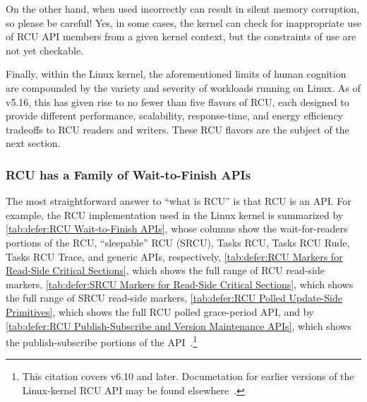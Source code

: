 On the other hand, when used incorrectly  can
result in silent memory corruption, so please be careful!
Yes, in some cases, the kernel can check for inappropriate use of
RCU API members from a given kernel context, but the constraints of
 use are not yet checkable.

Finally, within the Linux kernel, the aforementioned limits of human
cognition are compounded by the variety and severity of workloads running
on Linux.
As of v5.16, this has given rise to no fewer than five flavors of
RCU, each designed to provide different performance, scalability,
response-time, and energy efficiency tradeoffs to RCU readers and writers.
These RCU flavors are the subject of the next section.

\subsubsection{RCU has a Family of Wait-to-Finish APIs}
\label{sec:defer:RCU has a Family of Wait-to-Finish APIs}

The most straightforward answer to ``what is RCU'' is that RCU is
an API\@.
For example, the RCU implementation used in the Linux kernel is
summarized by
\cref{tab:defer:RCU Wait-to-Finish APIs},
whose columns show the wait-for-readers portions of the RCU, ``sleepable''
RCU (SRCU), Tasks RCU, Tasks RCU Rude, Tasks RCU Trace, and generic APIs,
respectively,
\cref{tab:defer:RCU Markers for Read-Side Critical Sections},
which shows the full range of RCU read-side markers,
\cref{tab:defer:SRCU Markers for Read-Side Critical Sections},
which shows the full range of SRCU read-side markers,
\cref{tab:defer:RCU Polled Update-Side Primitives},
which shows the full RCU polled grace-period API,
and by
\cref{tab:defer:RCU Publish-Subscribe and Version Maintenance APIs},
which shows the publish-subscribe portions of the
API~\cite{PaulEMcKenney2024RCUAPI}.\footnote{
	This citation covers v6.10 and later.
	Documetation for earlier versions of the Linux-kernel RCU API may
	be found elsewhere~\cite{PaulEMcKenney2008WhatIsRCUAPI,PaulEMcKenney2014RCUAPI,PaulEMcKenney2019RCUAPI}.}

